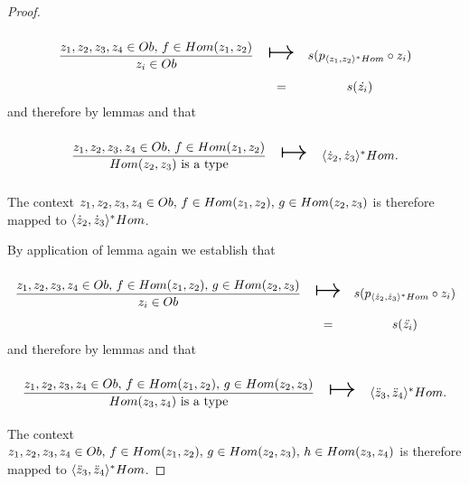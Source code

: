 \begin{proof}
\begin{equation*}
\begin{array}{c c c}
\forceSOURCEwidth & & \forceTARGETwidth \\ [-0.1cm]
\gatdisplayrule{\associativitypremisepoppop}{\ofT{z_i}{Ob}} & \Imapsto & s(p_{\associativitypremisepoppopmapped} \circ z_i) \\
                                                            & = & s(\dot{z_i})
\end{array}
\end{equation*}
and therefore by  lemmas  and  that 
\begin{equation*}
\begin{array}{c c c}
\forceSOURCEwidth & & \forceTARGETwidth \\ [-0.1cm]
\gatdisplayrule{\associativitypremisepoppop}{\isT{Hom(z_2,z_3)}} & \Imapsto & \associativitypremisepopmapped.
\end{array}
\end{equation*}

The context $z_1,z_2,z_3,z_4 \in Ob,\,f \in Hom(z_1,z_2),\,g \in Hom(z_2,z_3)$ is therefore mapped to $\langle\dot z_2,\dot z_3\rangle^*Hom$.

By application of lemma  again we establish that 
\begin{equation*}
\begin{array}{c c c}
\forceSOURCEwidth & & \forceTARGETwidth \\ [-0.1cm]
\gatdisplayrule{\associativitypremisepop}{\ofT{z_i}{Ob}} & \Imapsto & s(p_{\associativitypremisepopmapped} \circ z_i) \\
                                                            & = & s(\ddot{z_i})
\end{array}
\end{equation*}
and therefore by  lemmas  and  that 
\begin{equation*}
\begin{array}{c c c}
\forceSOURCEwidth & & \forceTARGETwidth \\ [-0.1cm]
\gatdisplayrule{\associativitypremisepop}{\isT{Hom(z_3,z_4)}} & \Imapsto & \associativitypremisemapped.
\end{array}
\end{equation*}
The context $z_1,z_2,z_3,z_4 \in Ob,\,f \in Hom(z_1,z_2),\,g \in Hom(z_2,z_3),\,h \in Hom(z_3,z_4)$ is therefore mapped to $\langle\ddot z_3,\ddot z_4\rangle^*Hom$.
\end{proof}

